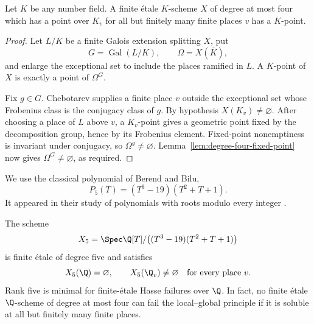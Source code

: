 \begin{corollary}
\label{cor:degree-four-local-global}
Let \(K\) be any number field.  A finite \'etale \(K\)-scheme \(X\) of
degree at most four which has a point over \(K_v\) for all but finitely many
finite places \(v\) has a \(K\)-point.
\end{corollary}

\begin{proof}
Let \(L/K\) be a finite Galois extension splitting \(X\), put
\[
 G=\operatorname{Gal}(L/K),
 \qquad
 \Omega=X(\overline K),
\]
and enlarge the exceptional set to include the places ramified in \(L\).
A \(K\)-point of \(X\) is exactly a point of \(\Omega^G\).

Fix \(g\in G\).  Chebotarev supplies a finite place \(v\) outside the
exceptional set whose Frobenius class is the conjugacy class of \(g\).
By hypothesis \(X(K_v)\neq\varnothing\).  After choosing a place of \(L\)
above \(v\), a \(K_v\)-point gives a geometric point fixed by the
decomposition group, hence by its Frobenius element.  Fixed-point
nonemptiness is invariant under conjugacy, so \(\Omega^g\neq\varnothing\).
Lemma~\ref{lem:degree-four-fixed-point} now gives
\(\Omega^G\neq\varnothing\), as required.
\end{proof}

We use the classical polynomial of Berend and Bilu,
\begin{equation}
 P_5(T)=(T^3-19)(T^2+T+1).
 \label{eq:BB}
\end{equation}
It appeared in their study of polynomials with roots modulo every integer
\cite{BerendBilu}.

\begin{theorem}
\label{thm:finite-etale-hasse}
The scheme
\[
 X_5=\Spec\Q[T]/\bigl((T^3-19)(T^2+T+1)\bigr)
\]
is finite \'etale of degree five and satisfies
\[
 X_5(\Q)=\varnothing,
 \qquad
 X_5(\Q_v)\neq\varnothing
 \quad\text{for every place }v.
\]
Rank five is minimal for finite-\'etale Hasse failures over \(\Q\).  In fact,
no finite \'etale \(\Q\)-scheme of degree at most four can fail the
local--global principle if it is soluble at all but finitely many finite
places.
\end{theorem}

